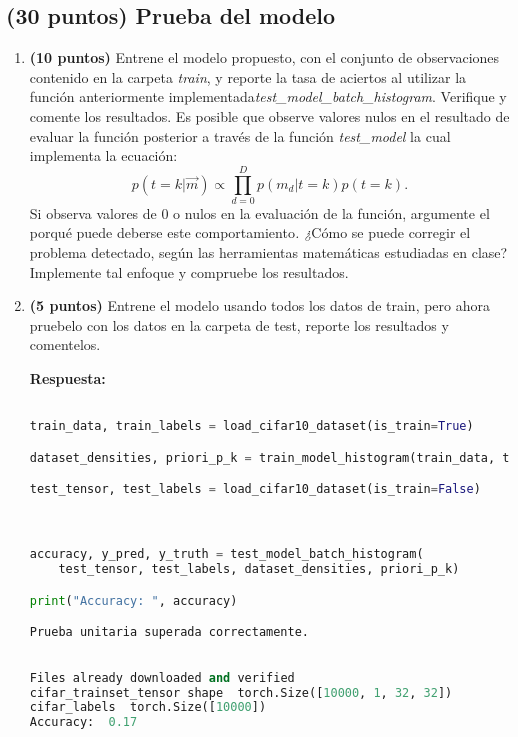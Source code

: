 \documentclass[spanish]{article}
\begin{document}
\subsection{(30 puntos) Prueba del modelo}
\begin{enumerate}
\item \textbf{(10 puntos)} Entrene el modelo propuesto, con el conjunto
de observaciones contenido en la carpeta \emph{train}, y reporte la
tasa de aciertos al utilizar la función anteriormente implementada\emph{test\_model\_batch\_histogram}.
Verifique y comente los resultados. Es posible que observe valores
nulos en el resultado de evaluar la función posterior a través de
la función \emph{test\_model }la cual implementa la ecuación:\emph{
}
\[
p\left(t=k|\overrightarrow{m}\right)\propto\prod_{d=0}^{D}p\left(m_{d}|t=k\right)p\left(t=k\right).
\]
Si\emph{ }observa valores de 0 o nulos en la evaluación de la función,
argumente el porqué puede deberse este comportamiento\emph{. ¿}Cómo
se puede corregir el problema detectado, según las herramientas matemáticas
estudiadas en clase? Implemente tal enfoque y compruebe los resultados. 
\item \textbf{(5 puntos)} Entrene el modelo usando todos los datos de train,
pero ahora pruebelo con los datos en la carpeta de test, reporte los
resultados y comentelos.

\vspace{15px}
\par \textbf{Respuesta:}
\begin{lstlisting}[language=Python, caption=Implementacion Prueba Modelo]

train_data, train_labels = load_cifar10_dataset(is_train=True)

dataset_densities, priori_p_k = train_model_histogram(train_data, train_labels)

test_tensor, test_labels = load_cifar10_dataset(is_train=False)



accuracy, y_pred, y_truth = test_model_batch_histogram(
    test_tensor, test_labels, dataset_densities, priori_p_k)

print("Accuracy: ", accuracy)

Prueba unitaria superada correctamente.

\end{lstlisting}

\begin{lstlisting}[language=Python, caption=Salida Pruba Modelo]

Files already downloaded and verified
cifar_trainset_tensor shape  torch.Size([10000, 1, 32, 32])
cifar_labels  torch.Size([10000])
Accuracy:  0.17


\end{lstlisting}
\end{enumerate}
\end{document}
